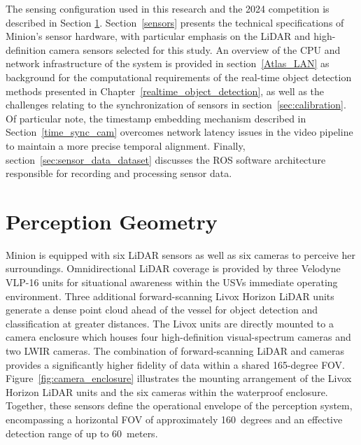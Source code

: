 \documentclass{erauthesis}
\begin{document}
The sensing configuration used in this research and the 2024 competition is described in Section \ref{perception_geometry}.
Section~\ref{sensors} presents the technical specifications of Minion's sensor hardware, with particular emphasis on the \ac{LiDAR} and high-definition camera sensors selected for this study.
An overview of the CPU and network infrastructure of the system is provided in section~\ref{Atlas_LAN} as background for the computational requirements of the real-time object detection methods presented in Chapter~\ref{realtime_object_detection}, as well as the challenges relating to the synchronization of sensors in section~\ref{sec:calibration}.
Of particular note, the timestamp embedding mechanism described in Section~\ref{time_sync_cam} overcomes network latency issues in the video pipeline to maintain a more precise temporal alignment.
Finally, section~\ref{sec:sensor_data_dataset} discusses the \ac{ROS} software architecture responsible for recording and processing sensor data.

\section{Perception Geometry} \label{perception_geometry}

Minion is equipped with six \ac{LiDAR} sensors as well as six cameras to perceive her surroundings.
Omnidirectional \ac{LiDAR} coverage is provided by three Velodyne VLP-16 units for situational awareness within the \acp{USV} immediate operating environment.
Three additional forward-scanning Livox Horizon \ac{LiDAR} units generate a dense point cloud ahead of the vessel for object detection and classification at greater distances.
The Livox units are directly mounted to a camera enclosure which houses four high-definition visual-spectrum cameras and two \ac{LWIR} cameras.
The combination of forward-scanning LiDAR and cameras provides a significantly higher fidelity of data within a shared 165-degree \ac{FOV}. %
Figure~\ref{fig:camera_enclosure} illustrates the mounting arrangement of the Livox Horizon LiDAR units and the six cameras within the waterproof enclosure.
Together, these sensors define the operational envelope of the perception system, encompassing a horizontal \ac{FOV} of approximately 160~degrees and an effective detection range of up to 60~meters.
\end{document}
